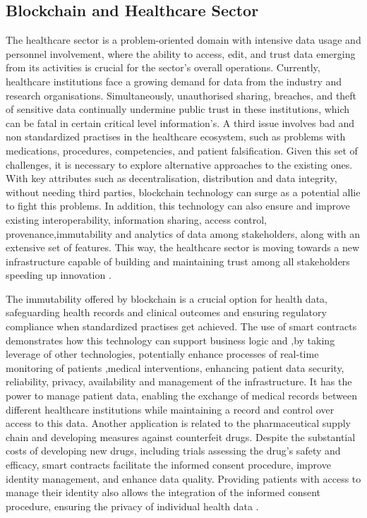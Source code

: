 \subsection{Blockchain and Healthcare Sector}
The healthcare sector is a problem-oriented domain with intensive data usage and personnel involvement, where the ability to access, edit, and trust data emerging from its activities is crucial for the sector's overall operations. Currently, healthcare institutions face a growing demand for data from the industry and research organisations. Simultaneously, unauthorised sharing, breaches, and theft of sensitive data continually undermine public trust in these institutions, which can be fatal in certain critical level information's. A third issue involves bad and non standardized practises in the healthcare ecosystem, such as problems with medications, procedures, competencies, and patient falsification. Given this set of challenges, it is necessary to explore alternative approaches to the existing ones. With key attributes such as decentralisation, distribution and data integrity, without needing third parties, blockchain technology can surge as a potential allie to fight this problems. In addition, this technology can also ensure and improve existing interoperability, information sharing, access control, provenance,immutability and analytics of data among stakeholders, along with an extensive set of features. This way, the healthcare sector is moving towards a new infrastructure capable of building and maintaining trust among all stakeholders speeding up innovation \cite{systematic-review-of-blockchain}.

The immutability offered by blockchain is a crucial option for health data, safeguarding health records and clinical outcomes and ensuring regulatory compliance when standardized practises get achieved. The use of smart contracts demonstrates how this technology can support business logic and ,by taking leverage of other technologies, potentially enhance processes of real-time monitoring of patients ,medical interventions, enhancing patient data security, reliability, privacy, availability and management of the infrastructure. It has the power to manage patient data, enabling the exchange of medical records between different healthcare institutions while maintaining a record and control over access to this data. Another application is related to the pharmaceutical supply chain and developing measures against counterfeit drugs. Despite the substantial costs of developing new drugs, including trials assessing the drug's safety and efficacy, smart contracts facilitate the informed consent procedure, improve identity management, and enhance data quality. Providing patients with access to manage their identity also allows the integration of the informed consent procedure, ensuring the privacy of individual health data \cite{blockchain-in-healthcare-2}.

